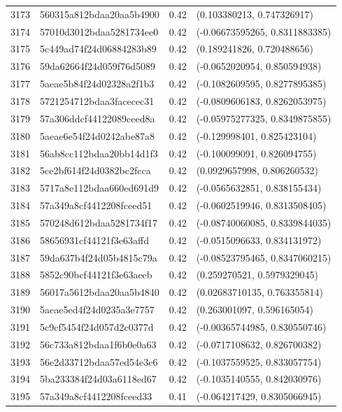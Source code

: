 \begin{table}[ht]
\begin{tabular}{rlrl}
  3173 & 560315a812bdaa20aa5b4900 & 0.42 & (0.103380213, 0.747326917) \\ 
  3174 & 57010d3012bdaa5281734ee0 & 0.42 & (-0.06673595265, 0.8311883385) \\ 
  3175 & 5c449ad74f24d06884283b89 & 0.42 & (0.189241826, 0.720488656) \\ 
  3176 & 59da62664f24d059f76d5089 & 0.42 & (-0.0652020954, 0.850594938) \\ 
  3177 & 5aeae5b84f24d02328a2f1b3 & 0.42 & (-0.1082609595, 0.8277895385) \\ 
  3178 & 5721254712bdaa3facecec31 & 0.42 & (-0.0809606183, 0.8262053975) \\ 
  3179 & 57a306ddcf44122089ceed8a & 0.42 & (-0.05975277325, 0.8349875855) \\ 
  3180 & 5aeae6e54f24d0242abe87a8 & 0.42 & (-0.129998401, 0.825423104) \\ 
  3181 & 56ab8cc112bdaa20bb14d1f3 & 0.42 & (-0.100099091, 0.826094755) \\ 
  3182 & 5ce2bf614f24d0382bc2fcca & 0.42 & (0.0929657998, 0.806260532) \\ 
  3183 & 5717a8e112bdaa660ed691d9 & 0.42 & (-0.0565632851, 0.838155434) \\ 
  3184 & 57a349a8cf4412208fceed51 & 0.42 & (-0.0602519946, 0.8313508405) \\ 
  3185 & 570248d612bdaa5281734f17 & 0.42 & (-0.08740060085, 0.8339844035) \\ 
  3186 & 58656931cf44121f3e63affd & 0.42 & (-0.0515096633, 0.834131972) \\ 
  3187 & 59da637b4f24d05b4815c79a & 0.42 & (-0.08523795465, 0.8347060215) \\ 
  3188 & 5852c90bcf44121f3e63aeeb & 0.42 & (0.259270521, 0.5979329045) \\ 
  3189 & 56017a5612bdaa20aa5b4840 & 0.42 & (0.02683710135, 0.763355814) \\ 
  3190 & 5aeae5ed4f24d0235a3e7757 & 0.42 & (0.263001097, 0.596165054) \\ 
  3191 & 5c9cf5454f24d057d2c0377d & 0.42 & (-0.00365744985, 0.830550746) \\ 
  3192 & 56c733a812bdaa1f6b0e0a63 & 0.42 & (-0.0717108632, 0.826700382) \\ 
  3193 & 56e2d33712bdaa57ed54e3c6 & 0.42 & (-0.1037559525, 0.833057754) \\ 
  3194 & 5ba233384f24d03a6118ed67 & 0.42 & (-0.1035140555, 0.842030976) \\ 
  3195 & 57a349a8cf4412208fceed33 & 0.41 & (-0.064217429, 0.8305066945) \\ 

\end{tabular}
\end{table}
